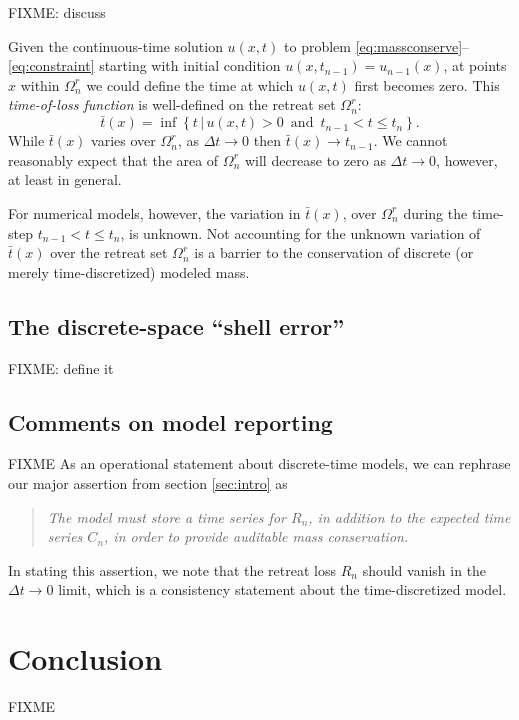\documentclass[final,leqno,onefignum,onetabnum]{siamltex1213bueler}
\begin{document}
FIXME: discuss

Given the continuous-time solution $u(x,t)$ to problem \eqref{eq:massconserve}--\eqref{eq:constraint} starting with initial condition $u(x,t_{n-1}) = u_{n-1}(x)$, at points $x$ within $\Omega_n^r$ we could define the time at which $u(x,t)$ first becomes zero.  This \emph{time-of-loss function} is well-defined on the retreat set $\Omega_n^r$:
\begin{equation}
\bar t(x) = \inf\left\{t \,\big|\, u(x,t)>0 \,\text{ and }\, t_{n-1} < t \le t_n\right\}.
\end{equation}
While $\bar t(x)$ varies over $\Omega_n^r$, as $\Delta t \to 0$ then $\bar t(x) \to t_{n-1}$.  We cannot reasonably expect that the area of $\Omega_n^r$ will decrease to zero as $\Delta t \to 0$, however, at least in general.

For numerical models, however, the variation in $\bar t(x)$, over $\Omega_n^r$ during the time-step $t_{n-1} < t \le t_n$, is unknown.  Not accounting for the unknown variation of $\bar t(x)$ over the retreat set $\Omega_n^r$ is a barrier to the conservation of discrete (or merely time-discretized) modeled mass.

\subsection{The discrete-space ``shell error''}  \label{subsec:shellerror}  FIXME: define it

\subsection{Comments on model reporting}  \label{subsec:comments}  FIXME As an operational statement about discrete-time models, we can rephrase our major assertion from section \ref{sec:intro} as
\begin{quote}
\emph{The model must store a time series for $R_n$, in addition to the expected time series $C_n$, in order to provide auditable mass conservation.}
\end{quote}
In stating this assertion, we note that the retreat loss $R_n$ should vanish in the $\Delta t\to 0$ limit, which is a consistency statement about the time-discretized model.


\section{Conclusion} \label{sec:conclusion}  FIXME




\end{document}
